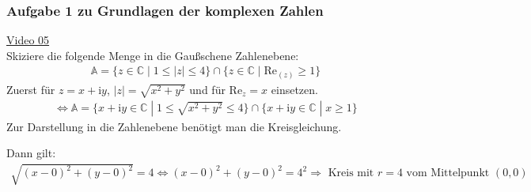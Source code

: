 \subsubsection{Aufgabe 1 zu Grundlagen der komplexen Zahlen }
\href{https://youtu.be/xC24jiGbXjo}{Video 05}\\
Skiziere die folgende Menge in die Gaußschene Zahlenebene:\\
\begin{align*}
\mathbb{A}= \{z \in  \mathbb{C}\;|\; 1\leq|z| \leq 4\}\cap\{z\in  \mathbb{C}\;|\; \mathrm{Re}_{(z)}\geq 1\}
\end{align*}
Zuerst für $ z=x+\mathrm{i}y $, $ |z|=\sqrt{x^2+y^2} $ und für $ \mathrm{Re}_{z}=x$ einsetzen.\\
\begin{align*}
\Leftrightarrow\mathbb{A}= \{x+\mathrm{i}y \in  \mathbb{C}\;|\; 1\leq \sqrt{x^2+y^2} \leq 4\}\cap\{x+\mathrm{i}y\in  \mathbb{C}\;|\; x\geq 1\}
\end{align*}
Zur Darstellung in die Zahlenebene benötigt man die Kreisgleichung.\\
\begin{center}
\end{center}
Dann gilt:\\
\begin{align*}
\sqrt{(x-0)^2+(y-0)^2}=4\Leftrightarrow (x-0)^2+(y-0)^2=4^2\Rightarrow \text{ Kreis mit } r=4 \text{ vom Mittelpunkt } (0,0)\\
\end{align*}
